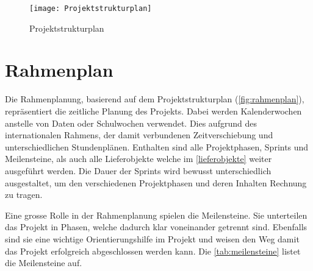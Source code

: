 \newpage

\begin{landscape}
\begin{figure}[ht]
\centering
\texttt{[image: Projektstrukturplan]}
\caption{Projektstrukturplan}
\label{fig:projektstrukturplan}
\end{figure}
\end{landscape}

\newpage

\section{Rahmenplan}
Die Rahmenplanung, basierend auf dem Projektstrukturplan (\autoref{fig:rahmenplan}), repräsentiert die zeitliche Planung des Projekts. Dabei werden Kalenderwochen anstelle von Daten oder Schulwochen verwendet. Dies aufgrund des internationalen Rahmens, der damit verbundenen Zeitverschiebung und unterschiedlichen Stundenplänen. Enthalten sind alle Projektphasen, Sprints und Meilensteine, als auch alle Lieferobjekte welche im \autoref{lieferobjekte} weiter ausgeführt werden. Die Dauer der Sprints wird bewusst unterschiedlich ausgestaltet, um den verschiedenen Projektphasen und deren Inhalten Rechnung zu tragen.

Eine grosse Rolle in der Rahmenplanung spielen die Meilensteine. Sie unterteilen das Projekt in Phasen, welche dadurch klar voneinander getrennt sind. Ebenfalls sind sie eine wichtige Orientierungshilfe im Projekt und weisen den Weg damit das Projekt erfolgreich abgeschlossen werden kann. Die \autoref{tab:meilensteine} listet die Meilensteine auf.


